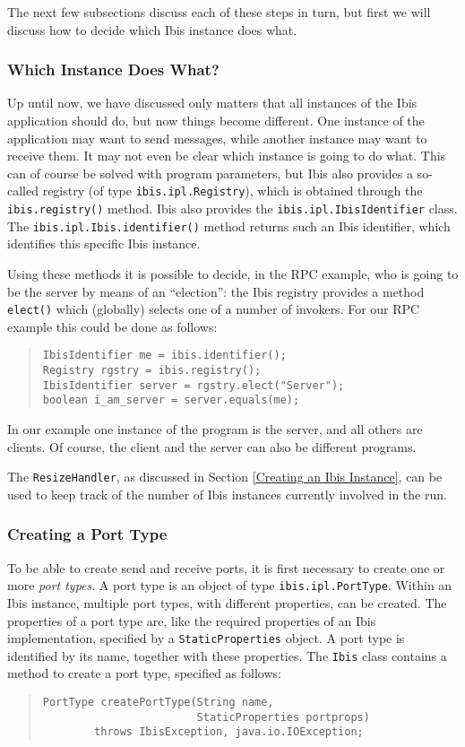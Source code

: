 \documentclass[10pt]{article}
\newcommand{\mysubsubsection}[1]{\subsubsection{#1}\label{#1}}
\begin{document}
\noindent
The next few subsections discuss each of these steps in turn, but
first we will discuss how to decide which Ibis instance does what.

\mysubsubsection{Which Instance Does What?}

Up until now, we have discussed only matters that all instances of
the Ibis application should do, but now things become different.
One instance of the application may want to send messages, while
another instance may want to receive them.
It may not even be clear which instance is going to do what.
This can of course be solved with program parameters, but Ibis
also provides a so-called registry (of type
\texttt{ibis.ipl.Registry}), which is obtained through the
\texttt{ibis.registry()} method.
Ibis also provides the \texttt{ibis.ipl.IbisIdentifier} class.
The \texttt{ibis.ipl.Ibis.identifier()} method returns such an
Ibis identifier, which identifies this specific Ibis instance.

Using these methods it is possible to decide, in the RPC example,
who is going to be the server by means of an ``election'': the Ibis
registry provides a method \texttt{elect()} which (globally) selects
one of a number of invokers.  For our RPC example this could be done as
follows:

\begin{quote}
\begin{verbatim}
IbisIdentifier me = ibis.identifier();
Registry rgstry = ibis.registry();
IbisIdentifier server = rgstry.elect("Server");
boolean i_am_server = server.equals(me);
\end{verbatim}
\end{quote}

In our example one instance of the program is the server, and all
others are clients.  Of course, the client and the server can also
be different programs.

The \texttt{ResizeHandler}, as discussed in Section
\ref{Creating an Ibis Instance}, can be used to keep track of the number
of Ibis instances currently involved in the run.

\subsubsection{Creating a Port Type}

To be able to create send and receive ports, it is first necessary
to create one or more \emph{port types}.
A port type is an object
of type \texttt{ibis.ipl.PortType}.
Within an Ibis instance,
multiple port types, with different properties, can be created.
The properties of a port type are, like the required properties
of an Ibis implementation, specified by a \texttt{StaticProperties} object.
A port type is identified by its name, together with these properties.
The \texttt{Ibis} class contains a method to create a port type,
specified as follows:
\begin{quote}
\begin{verbatim}
PortType createPortType(String name,
                        StaticProperties portprops)
        throws IbisException, java.io.IOException;
\end{verbatim}
\end{quote}
\end{document}

